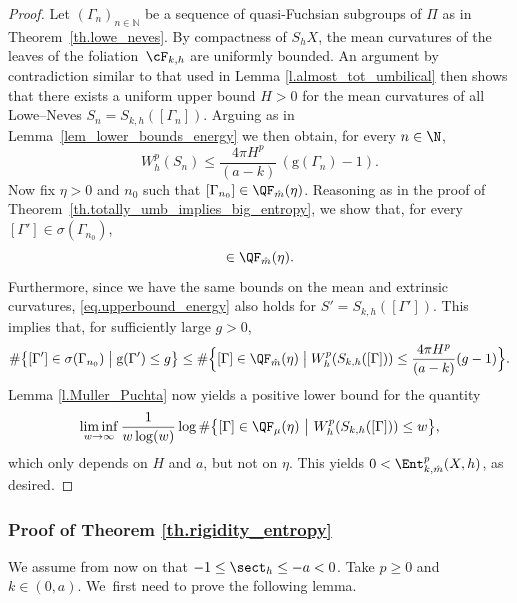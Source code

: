 \begin{proof} Let $(\Gamma_n)_{n\in\mathbb{N}}$ be a sequence of quasi-Fuchsian subgroups of $\Pi$ as in Theorem~\ref{th.lowe_neves}. By compactness of $S_hX$, the mean curvatures of the leaves of the foliation~$\cF_{k,h}$ are uniformly bounded. An argument by contradiction similar to that used in Lemma \ref{l.almost_tot_umbilical} then shows that there exists a uniform upper bound $H>0$ for the mean curvatures of all Lowe--Neves \ksurfaces $S_n=S_{k,h}([\Gamma_n])$. Arguing as in Lemma~\ref{lem_lower_bounds_energy} we then obtain, for every $n\in\N$,
\begin{equation}\label{eq.upperbound_energy}
W^{p}_{h}(S_n)\leq \frac{4\pi H^p}{(a-k)}\,(\mathrm{g}(\Gamma_n)-1).
\end{equation}
Now fix $\eta>0$ and $n_0$ such that $[\Gamma_{n_0}]\in\QF_{\hat m}(\eta)$. Reasoning as in the proof of Theo\-rem~\ref{th.totally_umb_implies_big_entropy}, we show that, for every $[\Gamma']\in\sigma(\Gamma_{n_0})$,
\begin{equation*}
[\Gamma']\in\QF_{\hat m}(\eta).
\end{equation*}
Furthermore, since we have the same bounds on the mean and extrinsic curvatures, \eqref{eq.upperbound_energy} also holds for $S'=S_{k,h}([\Gamma'])$. This implies that, for sufficiently large $g>0$,
\begin{equation*}
\#\bigl\{[\Gamma']\in\sigma(\Gamma_{n_0})\bigm| \mathrm{g}(\Gamma')\leq g\bigr\}\leq\#\Bigl\{[\Gamma]\in\QF_{\hat m}(\eta)\bigm| W^{p}_{h}(S_{k,h}([\Gamma]))\leq \frac{4\pi H^p}{(a-k)}(g-1)\Bigr\}.
\end{equation*}
Lemma \ref{l.Muller_Puchta} now yields a positive lower bound for the quantity
\begin{equation*}
\liminf_{w\to\infty}\frac{1}{w\log(w)}\log\#\bigl\{[\Gamma]\in\QF_\mu(\eta)\ \big|\ W^{p}_{h}(S_{k,h}([\Gamma]))\leq w\bigr\},
\end{equation*}
which only depends on $H$ and $a$, but not on $\eta$. This yields $0<\Ent^p_{k,\hat m}(X,h)$, as desired.
\end{proof}


\subsubsection{Proof of Theorem \ref{th.rigidity_entropy}} We assume from now on that $-1\leq\sect_h\leq -a <0$. Take $p\geq 0$ and $k\in(0,a)$. We~first need to prove the following lemma.

